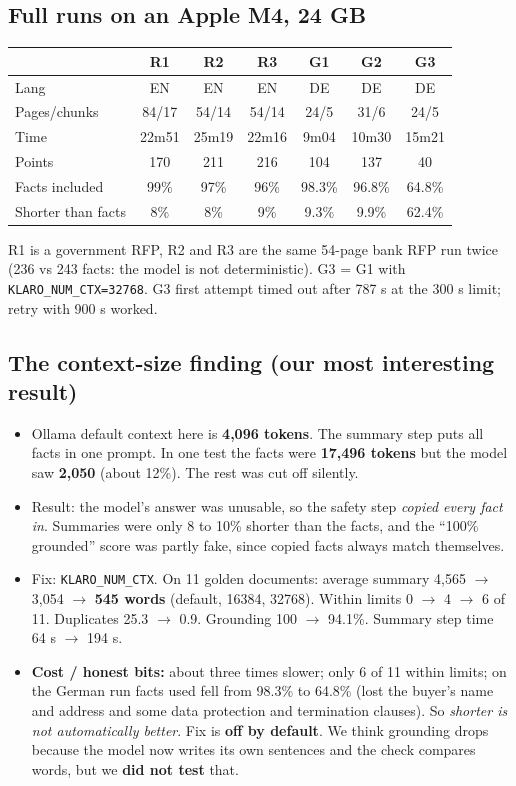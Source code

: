 \subsection{Full runs on an Apple M4, 24 GB}
\begin{tabularx}{\linewidth}{@{}Lcccccc@{}}\toprule
 & R1 & R2 & R3 & G1 & G2 & G3\\\midrule
Lang & EN & EN & EN & DE & DE & DE\\
Pages/chunks & 84/17 & 54/14 & 54/14 & 24/5 & 31/6 & 24/5\\
Time & 22m51 & 25m19 & 22m16 & 9m04 & 10m30 & 15m21\\
Points & 170 & 211 & 216 & 104 & 137 & 40\\
Facts included & 99\% & 97\% & 96\% & 98.3\% & 96.8\% & 64.8\%\\
Shorter than facts & 8\% & 8\% & 9\% & 9.3\% & 9.9\% & 62.4\%\\\bottomrule
\end{tabularx}
R1 is a government RFP, R2 and R3 are the same 54-page bank RFP run twice (236 vs 243 facts: the model is not deterministic). G3 = G1 with \texttt{KLARO\_NUM\_CTX=32768}. G3 first attempt timed out after 787 s at the 300 s limit; retry with 900 s worked.

\subsection{The context-size finding (our most interesting result)}
\begin{itemize}
\item Ollama default context here is \textbf{4,096 tokens}. The summary step puts all facts in one prompt. In one test the facts were \textbf{17,496 tokens} but the model saw \textbf{2,050} (about 12\%). The rest was cut off silently.
\item Result: the model's answer was unusable, so the safety step \emph{copied every fact in}. Summaries were only 8 to 10\% shorter than the facts, and the ``100\% grounded'' score was partly fake, since copied facts always match themselves.
\item Fix: \texttt{KLARO\_NUM\_CTX}. On 11 golden documents: average summary 4,565 $\rightarrow$ 3,054 $\rightarrow$ \textbf{545 words} (default, 16384, 32768). Within limits 0 $\rightarrow$ 4 $\rightarrow$ 6 of 11. Duplicates 25.3 $\rightarrow$ 0.9. Grounding 100 $\rightarrow$ 94.1\%. Summary step time 64 s $\rightarrow$ 194 s.
\item \textbf{Cost / honest bits:} about three times slower; only 6 of 11 within limits; on the German run facts used fell from 98.3\% to 64.8\% (lost the buyer's name and address and some data protection and termination clauses). So \emph{shorter is not automatically better}. Fix is \textbf{off by default}. We think grounding drops because the model now writes its own sentences and the check compares words, but we \textbf{did not test} that.
\end{itemize}

